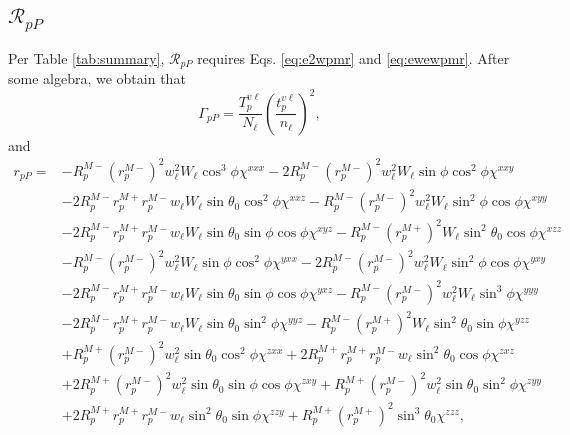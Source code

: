 
\subsection{\texorpdfstring{$\mathcal{R}_{pP}$}{RpP}}\label{sec:RpP} 

Per Table \ref{tab:summary}, $\mathcal{R}_{pP}$ requires Eqs. \eqref{eq:e2wpmr} and \eqref{eq:ewewpmr}. After some algebra, we obtain that
\begin{equation}\label{eq:mc78}
\Gamma_{pP} =
\frac{T^{v\ell}_{p}}{N_{\ell}}
\left(\frac{t^{v\ell}_{p}}{n_{\ell}}\right)^{2}
,
\end{equation}
and
\begin{equation}
\begin{split}
r_{pP}
=
&-R^{M-}_{p}\left(r^{M-}_{p}\right)^{2}w^{2}_{\ell}W_{\ell}\cos^{3}\phi
\chi^{xxx}
 -2R^{M-}_{p}\left(r^{M-}_{p}\right)^{2}w^{2}_{\ell}W_{\ell}\sin\phi\cos^{2}\phi
\chi^{xxy}\\
&-2R^{M-}_{p}r^{M+}_{p}r^{M-}_{p}w_{\ell}W_{\ell}\sin\theta_{0}\cos^{2}\phi
\chi^{xxz}
 -R^{M-}_{p}\left(r^{M-}_{p}\right)^{2}w^{2}_{\ell}W_{\ell}\sin^{2}\phi\cos\phi
\chi^{xyy}\\
&-2R^{M-}_{p}r^{M+}_{p}r^{M-}_{p}w_{\ell}W_{\ell}\sin\theta_{0}\sin\phi\cos\phi
\chi^{xyz}
 -R^{M-}_{p}\left(r^{M+}_{p}\right)^{2}W_{\ell}\sin^{2}\theta_{0}\cos\phi
\chi^{xzz}\\
&-R^{M-}_{p}\left(r^{M-}_{p}\right)^{2}w^{2}_{\ell}W_{\ell}\sin\phi\cos^{2}\phi
\chi^{yxx}
 -2R^{M-}_{p}\left(r^{M-}_{p}\right)^{2}w^{2}_{\ell}W_{\ell}\sin^{2}\phi\cos\phi
\chi^{yxy}\\
&-2R^{M-}_{p}r^{M+}_{p}r^{M-}_{p}w_{\ell}W_{\ell}\sin\theta_{0}\sin\phi\cos\phi
\chi^{yxz}
 -R^{M-}_{p}\left(r^{M-}_{p}\right)^{2}w^{2}_{\ell}W_{\ell}\sin^{3}\phi
\chi^{yyy}\\
&-2R^{M-}_{p}r^{M+}_{p}r^{M-}_{p}w_{\ell}W_{\ell}\sin\theta_{0}\sin^{2}\phi
\chi^{yyz}
 -R^{M-}_{p}\left(r^{M+}_{p}\right)^{2}W_{\ell}\sin^{2}\theta_{0}\sin\phi
\chi^{yzz}\\
&+R^{M+}_{p}\left(r^{M-}_{p}\right)^{2}w^{2}_{\ell}\sin\theta_{0}\cos^{2}\phi
\chi^{zxx}
 +2R^{M+}_{p}r^{M+}_{p}r^{M-}_{p}w_{\ell}\sin^{2}\theta_{0}\cos\phi
\chi^{zxz}\\
&+2R^{M+}_{p}\left(r^{M-}_{p}\right)^{2}w^{2}_{\ell}\sin\theta_{0}\sin\phi
\cos\phi\chi^{zxy}
 +R^{M+}_{p}\left(r^{M-}_{p}\right)^{2}w^{2}_{\ell}\sin\theta_{0}\sin^{2}\phi
\chi^{zyy}\\
&+2R^{M+}_{p}r^{M+}_{p}r^{M-}_{p}w_{\ell}\sin^{2}\theta_{0}\sin\phi
\chi^{zzy}
 +R^{M+}_{p}\left(r^{M+}_{p}\right)^{2}\sin^{3}\theta_{0}
\chi^{zzz}
,
\end{split}
\end{equation}
